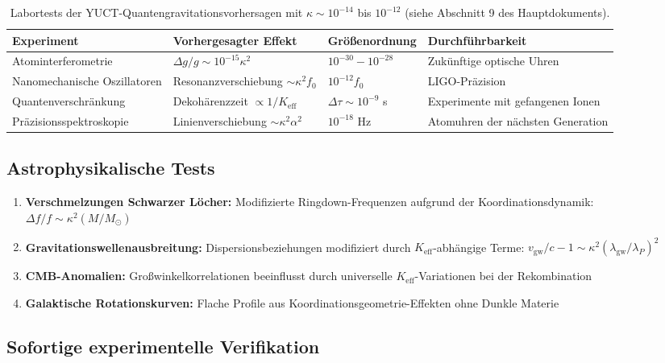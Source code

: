 \documentclass[12pt,a4paper]{article}
\theoremstyle{remark}
\newcommand{\Keff}{K_{\mathrm{eff}}}
\begin{document}
	\begin{table}[htbp]
		\centering
		\begin{tabular}{p{2.8cm}p{4.2cm}p{2.5cm}p{2.5cm}}
			\toprule
			\textbf{Experiment} & \textbf{Vorhergesagter Effekt} & \textbf{Größenordnung} & \textbf{Durchführbarkeit} \\
			\midrule
			Atominterferometrie & $\Delta g/g \sim 10^{-15}\kappa^2$ & $10^{-30} - 10^{-28}$ & Zukünftige optische Uhren \\
			Nanomechanische Oszillatoren & Resonanzverschiebung $\sim \kappa^2 f_0$ & $10^{-12} f_0$ & LIGO-Präzision \\
			Quantenverschränkung & Dekohärenzzeit $\propto 1/\Keff$ & $\Delta\tau \sim 10^{-9}$ s & Experimente mit gefangenen Ionen \\
			Präzisionsspektroskopie & Linienverschiebung $\sim \kappa^2 \alpha^2$ & $10^{-18}$ Hz & Atomuhren der nächsten Generation \\
			\bottomrule
		\end{tabular}
		\caption{Labortests der YUCT-Quantengravitationsvorhersagen mit $\kappa \sim 10^{-14}$ bis $10^{-12}$ (siehe Abschnitt 9 des Hauptdokuments).}
		\label{tab:lab-tests}
	\end{table}
	
	\subsection{Astrophysikalische Tests}
	
	\begin{enumerate}
		\item \textbf{Verschmelzungen Schwarzer Löcher:} Modifizierte Ringdown-Frequenzen aufgrund der Koordinationsdynamik: $\Delta f/f \sim \kappa^2 (M/M_\odot)$
		
		\item \textbf{Gravitationswellenausbreitung:} Dispersionsbeziehungen modifiziert durch $\Keff$-abhängige Terme: $v_{\text{gw}}/c - 1 \sim \kappa^2 (\lambda_{\text{gw}}/\lambda_P)^2$
		
		\item \textbf{CMB-Anomalien:} Großwinkelkorrelationen beeinflusst durch universelle $\Keff$-Variationen bei der Rekombination
		
		\item \textbf{Galaktische Rotationskurven:} Flache Profile aus Koordinationsgeometrie-Effekten ohne Dunkle Materie
	\end{enumerate}
	
	\subsection{Sofortige experimentelle Verifikation}
	
\end{document}
